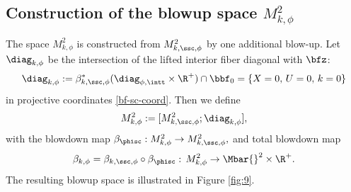 \subsection{Construction of the blowup space $M^{2}_{k,\phi}$}
The space $M^{2}_{k,\phi}$ is constructed from $M^{2}_{k, \ssc,\phi}$
by one additional blow-up. Let $\diag_{k,\phi}$ be the intersection of the lifted interior fiber diagonal with $\bfz$:
\begin{equation}
\label{eqn:def diag k phi}
\diag_{k,\phi} := \beta_{k,\ssc,\phi}^*(\diag_{\phi,\intt}\times\R^+) \cap \bbf_0 = \{ X=0,\, U=0,\, k=0\}
\end{equation}
in projective coordinates
\eqref{bf-sc-coord}.
Then we define
\begin{equation}
M^{2}_{k,\phi} := [ M^{2}_{k, \ssc,\phi} ; \diag_{k,\phi}],
\end{equation}
with the blowdown map $\beta_{ \phisc} : M^{2}_{k, \phi} \to M^{2}_{k, \ssc,\phi},$ and total blowdown map
\begin{equation*}
\beta_{k, \phi} = \beta_{k, \ssc,\phi} \circ \beta_{\phisc} :\,
M^{2}_{k,\phi} \to \Mbar{}^{2} \times \R^+.
\end{equation*}
The resulting blowup space is illustrated in Figure \ref{fig:9}.

